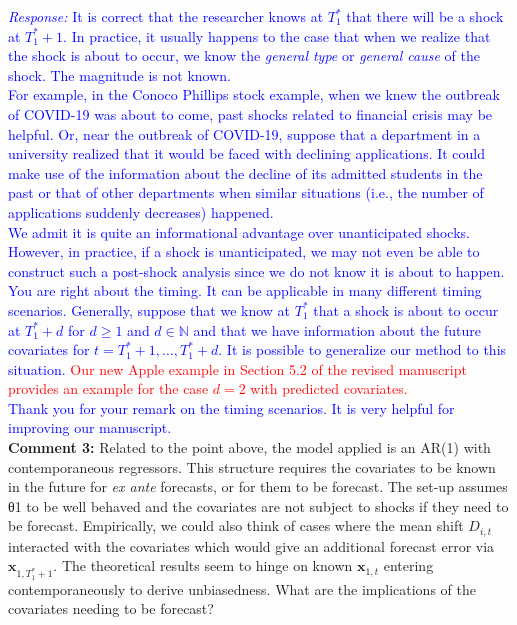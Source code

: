 \documentclass[12pt]{article}
\newcommand{\response}[1]{\noindent \textcolor{blue}{\emph{Response:} #1}}
\begin{document}
\response{It is correct that the researcher knows at $T_1^*$ that there will be a shock at $T_1^* + 1$. In practice, it usually happens to the case that when we realize that the shock is about to occur, we  know the \emph{general type}  or \emph{general cause} of the shock. The magnitude is not known. \\

For example, in the Conoco Phillips stock example, when we knew the outbreak of COVID-19 was about to come, past shocks related to financial crisis may be helpful. Or, near the outbreak of COVID-19, suppose that a department in a university realized that it would be faced with declining applications. It could make use of the information about the decline of its admitted students in the past or that of other departments when similar situations (i.e., the number of applications suddenly decreases) happened.\\

We admit it is quite an informational advantage over unanticipated shocks. However, in practice, if a shock is unanticipated, we may not even be able to construct such a post-shock analysis since we do not know it is about to happen.\\

You are right about the timing. It can be applicable in many different timing scenarios. Generally, suppose that we know at $T_1^*$ that a shock is about to occur at $T_1^* + d$ for $d\geq 1$ and $d\in \mathbb{N}$ and that we have information about the future covariates for $t = T_1^* +1 , \ldots, T_1^* + d$. It is possible to generalize our method to this situation. \textcolor{red}{Our new Apple example in Section 5.2 of the revised manuscript provides an example for the case $d=2$ with predicted covariates.}\\

Thank you for your remark on the timing scenarios. It is very helpful for improving our manuscript.} \\

{\bf Comment 3:} Related to the point above, the model applied is an AR(1) with contemporaneous regressors. This structure requires the covariates to be known in the future for \emph{ex ante} forecasts, or for them to be forecast. The set-up assumes θ1 to be well behaved and the covariates are not subject to shocks if they need to be forecast. Empirically, we could also think of cases where the mean shift $D_{i,t}$ interacted with the covariates which would give an additional forecast error via $\mathbf{x}_{1, T_1^* + 1}$. The theoretical results seem to hinge on known $\mathbf{x}_{1,t}$ entering contemporaneously to derive unbiasedness. What are the implications of the covariates needing to be forecast? \\
\end{document}
